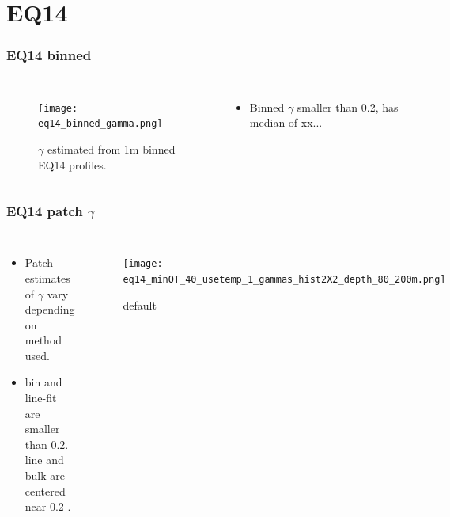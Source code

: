 \documentclass{beamer}
\begin{document}
\section{EQ14}

\begin{frame}
 \frametitle{EQ14 binned}


\begin{columns}
\begin{figure}[htbp]
\begin{center}
\texttt{[image: eq14\_binned\_gamma.png]}
\caption{$\gamma$ estimated from 1m binned EQ14 profiles.}
\label{default}
\end{center}
\end{figure}

\begin{itemize}
\item Binned $\gamma$ smaller than 0.2, has median of xx...
\end{itemize}

\end{columns}

\end{frame}


\begin{frame}
 \frametitle{EQ14 patch $\gamma$}


\begin{columns}
\begin{itemize}
\item Patch estimates of $\gamma$ vary depending on method used.
\item bin and line-fit are smaller than 0.2. line and bulk are centered near 0.2 .
\end{itemize}

\begin{figure}[htbp]
\begin{center}
\texttt{[image: eq14\_minOT\_40\_usetemp\_1\_gammas\_hist2X2\_depth\_80\_200m.png]}
\caption{default}
\label{default}
\end{center}
\end{figure}

\end{columns}



\end{frame}
\end{document}
